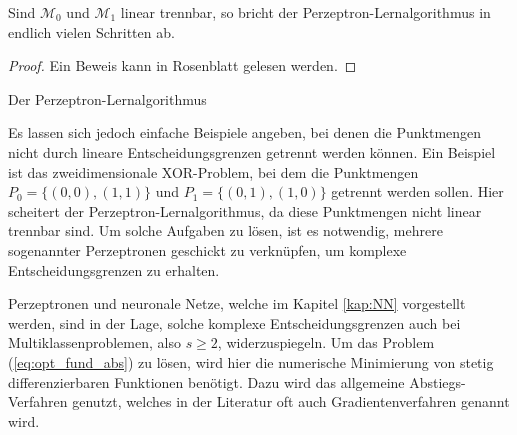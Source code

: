 \begin{satz}
    Sind $\mathcal{M}_0$ und $\mathcal{M}_1$ linear trennbar, so bricht der Perzeptron-Lernalgorithmus in endlich vielen Schritten ab.
\end{satz}
\begin{proof}
    Ein Beweis kann in Rosenblatt\cite{rosenblatt1958perceptron} gelesen werden.
\end{proof}

\begin{algorithm}[h]
    \caption{Der Perzeptron-Lernalgorithmus}\label{alg:pla}
\end{algorithm}

Es lassen sich jedoch einfache Beispiele angeben, bei denen die Punktmengen nicht durch lineare Entscheidungsgrenzen getrennt werden können. Ein Beispiel ist das zweidimensionale XOR-Problem, bei dem die Punktmengen $P_0=\{(0,0), (1,1)\}$ und $P_1=\{(0,1), (1,0) \}$ getrennt werden sollen. Hier scheitert der Perzeptron-Lernalgorithmus, da diese Punktmengen nicht linear trennbar sind. Um solche Aufgaben zu lösen, ist es notwendig, mehrere sogenannter Perzeptronen geschickt zu verknüpfen, um komplexe Entscheidungsgrenzen zu erhalten.

Perzeptronen und neuronale Netze, welche im Kapitel \ref{kap:NN} vorgestellt werden, sind in der Lage, solche komplexe Entscheidungsgrenzen auch bei Multiklassenproblemen, also $s $, widerzuspiegeln. Um das Problem (\ref{eq:opt_fund_abs}) zu lösen, wird hier die numerische Minimierung von stetig differenzierbaren Funktionen benötigt. Dazu wird das allgemeine Abstiegs-Verfahren genutzt, welches in der Literatur oft auch Gradientenverfahren genannt wird.


